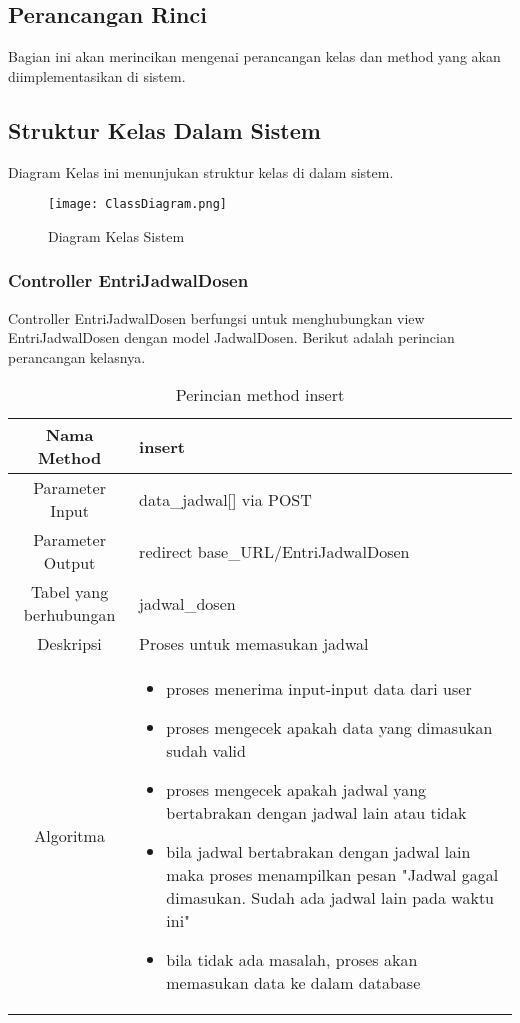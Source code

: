 \subsection{Perancangan Rinci}
Bagian ini akan merincikan mengenai perancangan kelas dan method yang akan diimplementasikan di sistem.

\subsection{Struktur Kelas Dalam Sistem}
Diagram Kelas ini menunjukan struktur kelas di dalam sistem.
\begin{figure} [H]
	\centering  
	\texttt{[image: ClassDiagram.png]}  
	\caption[Diagram Kelas Sistem]{Diagram Kelas Sistem} 
	\label{fig:skematik-phpexcel} 
\end{figure}
\subsubsection{Controller EntriJadwalDosen}
Controller EntriJadwalDosen berfungsi untuk menghubungkan view EntriJadwalDosen dengan model JadwalDosen. Berikut adalah perincian perancangan kelasnya. \\
\begin{center}
	\begin{table}[H]
	\caption{Perincian method insert}
\begin{tabular}{|c|p{11cm}|}
\hline
Nama Method 	& 	insert 	\\
\hline
Parameter Input & data\_jadwal[] via POST \\
\hline
Parameter Output & redirect base\_URL/EntriJadwalDosen\\
\hline
Tabel yang berhubungan & jadwal\_dosen \\
\hline
Deskripsi	& Proses untuk memasukan jadwal \\
\hline
Algoritma	& \begin{itemize}
				\item proses menerima input-input data dari user
				\item proses mengecek apakah data yang dimasukan sudah valid
				\item proses mengecek apakah jadwal yang bertabrakan dengan jadwal lain atau tidak
				\item bila jadwal bertabrakan dengan jadwal lain maka proses menampilkan pesan "Jadwal gagal dimasukan. Sudah ada jadwal lain pada waktu ini"
				\item bila tidak ada masalah, proses akan memasukan data ke dalam database
				\end{itemize} \\
\hline
\end{tabular}
\end{table}
\end{center}

